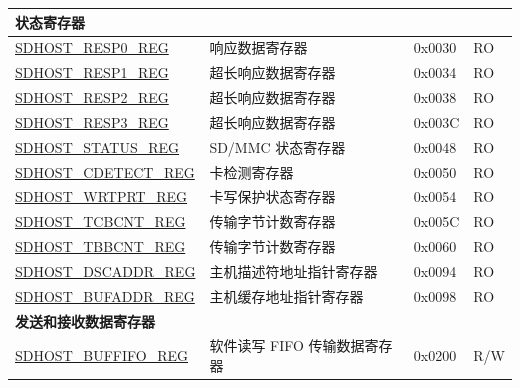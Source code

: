 \begin{longtable}{ | p{6cm} | p{7.0cm} | p{1.3cm} | p{1.2cm} | }
\multicolumn{4}{|l|}{\textbf{状态寄存器}} \\ \hline
\hyperref[regdesc:SDHOSTRESP0REG]{SDHOST\_RESP0\_REG} & 响应数据寄存器 & 0x0030 & RO \\ \hline
\hyperref[regdesc:SDHOSTRESP1REG]{SDHOST\_RESP1\_REG} & 超长响应数据寄存器& 0x0034 & RO \\ \hline
\hyperref[regdesc:SDHOSTRESP2REG]{SDHOST\_RESP2\_REG} & 超长响应数据寄存器 & 0x0038 & RO \\ \hline
\hyperref[regdesc:SDHOSTRESP3REG]{SDHOST\_RESP3\_REG} & 超长响应数据寄存器 & 0x003C & RO \\ \hline
\hyperref[regdesc:SDHOSTSTATUSREG]{SDHOST\_STATUS\_REG} & SD/MMC 状态寄存器 & 0x0048 & RO \\ \hline
\hyperref[regdesc:SDHOSTCDETECTREG]{SDHOST\_CDETECT\_REG} & 卡检测寄存器 & 0x0050 & RO \\ \hline
\hyperref[regdesc:SDHOSTWRTPRTREG]{SDHOST\_WRTPRT\_REG} & 卡写保护状态寄存器 & 0x0054 & RO \\ \hline
\hyperref[regdesc:SDHOSTTCBCNTREG]{SDHOST\_TCBCNT\_REG} & 传输字节计数寄存器 & 0x005C & RO \\ \hline
\hyperref[regdesc:SDHOSTTBBCNTREG]{SDHOST\_TBBCNT\_REG} & 传输字节计数寄存器 & 0x0060 & RO \\ \hline
\hyperref[regdesc:SDHOSTDSCADDRREG]{SDHOST\_DSCADDR\_REG} & 主机描述符地址指针寄存器 & 0x0094 & RO \\ \hline
\hyperref[regdesc:SDHOSTBUFADDRREG]{SDHOST\_BUFADDR\_REG} & 主机缓存地址指针寄存器 & 0x0098 & RO \\ \hline

\multicolumn{4}{|l|}{\textbf{发送和接收数据寄存器}} \\ \hline
\hyperref[regdesc:SDHOSTBUFFIFOREG]{SDHOST\_BUFFIFO\_REG} & 软件读写 FIFO 传输数据寄存器 & 0x0200 & R/W \\ \hline
\end{longtable}